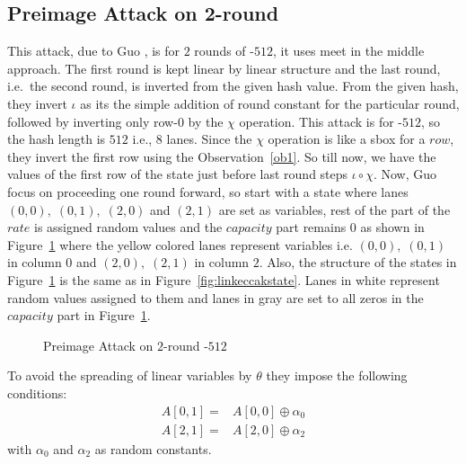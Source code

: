 \subsection{Preimage Attack on 2-round }
\label{section2RKeccak512}
This attack, due to Guo \etal\cite{guo2016linear}, is for $2$ rounds of \KECCAK-$512$, it uses meet in the middle approach. The first round is kept linear by linear structure and the last round, i.e.\ the second round, is inverted from the given hash value. From the given hash, they invert $\iota$ as its the simple addition of round constant for the particular round, followed by inverting only row-$0$ by the $\chi$ operation. This attack is for \KECCAK-$512$, so the hash length is $512$ i.e., $8$ lanes. Since the $\chi$ operation is like a sbox for a $row$, they invert the first row using the Observation~\ref{ob1}. So till now, we have the values of the first row of the state just before last round steps $\iota \circ \chi$. Now, Guo \etal focus on proceeding one round forward, so start with a state where lanes $(0,0),\; (0,1),\; (2,0) $ and $(2,1)$ are set as variables, rest of the part of the $rate$ is assigned random values and the $capacity$ part remains $0$ as shown in Figure~\ref{fig:2rkeccak512} where the yellow colored lanes represent variables i.e. $(0,0),\;(0,1)$ in column $0$ and $(2,0),\;(2,1)$ in column $2$. Also, the structure of the states in Figure~\ref{fig:2rkeccak512} is the same as in Figure~\ref{fig:linkeccakstate}. Lanes in white represent random values assigned to them and lanes in gray are set to all zeros in the $capacity$ part in Figure~\ref{fig:2rkeccak512}.
\begin{figure}
    \centering
    \caption{Preimage Attack on $2$-round \KECCAK-$512$}
    \label{fig:2rkeccak512}
\end{figure}
        To avoid the spreading of linear variables by $\theta$ they impose the following conditions: 
\begin{equation}
\begin{aligned}
	A[0, 1] =& A[0, 0] \oplus \alpha_{0}\\
	A[2, 1] =& A[2, 0] \oplus \alpha_{2}			
\end{aligned}
\end{equation}
        with $\alpha_0$ and $\alpha_2$ as random constants.
        

